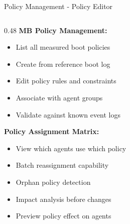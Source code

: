 \begin{frame}{Policy Management - Policy Editor}
\begin{columns}[T]
\begin{column}{0.48\textwidth}
      \textbf{MB Policy Management:}
      \vspace{-0.1cm}
      \begin{itemize}
        \setlength{\itemsep}{0pt}
        \item List all measured boot policies
        \item Create from reference boot log
        \item Edit policy rules and constraints
        \item Associate with agent groups
        \item Validate against known event logs
      \end{itemize}

      \vspace{0.05cm}

      \textbf{Policy Assignment Matrix:}
      \vspace{-0.1cm}
      \begin{itemize}
        \setlength{\itemsep}{0pt}
        \item View which agents use which policy
        \item Batch reassignment capability
        \item Orphan policy detection
        \item Impact analysis before changes
        \item Preview policy effect on agents
      \end{itemize}
    \end{column}
  \end{columns}
\end{frame}


